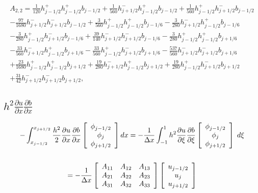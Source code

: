 \documentclass[12pt]{article}
\begin{document}
\begin{multline*} A_{2,2} = \frac{1}{120} h_{j-1/2}^+ h_{j-1/2}^+ b_{j-1/2}+\frac{1}{560} h_{j+1/2}^- h_{j-1/2}^+ b_{j-1/2}+\frac{1}{560} h_{j-1/2}^+ h_{j+1/2}^- b_{j-1/2}\\-\frac{97}{1680} h_{j+1/2}^- h_{j+1/2}^- b_{j-1/2}+\frac{3}{560} h_{j-1/2}^+ h_{j-1/2}^+ b_{j-1/6}-\frac{3}{280} h_{j+1/2}^- h_{j-1/2}^+ b_{j-1/6}\\-\frac{3}{280} h_{j-1/2}^+ h_{j+1/2}^- b_{j-1/6}+\frac{39}{140} h_{j+1/2}^- h_{j+1/2}^- b_{j-1/6}-\frac{3}{280} h_{j-1/2}^+ h_{j-1/2}^+ b_{j+1/6}\\-\frac{33}{560} h_{j+1/2}^- h_{j-1/2}^+ b_{j+1/6}-\frac{33}{560} h_{j-1/2}^+ h_{j+1/2}^- b_{j+1/6}-\frac{537}{560} h_{j+1/2}^- h_{j+1/2}^- b_{j+1/6}\\+\frac{23}{1680} h_{j-1/2}^+ h_{j-1/2}^+ b_{j+1/2}+\frac{19}{280} h_{j+1/2}^- h_{j-1/2}^+ b_{j+1/2}+\frac{19}{280} h_{j-1/2}^+ h_{j+1/2}^- b_{j+1/2}\\+\frac{31}{42} h_{j+1/2}^- h_{j+1/2}^- b_{j+1/2}, \end{multline*}
 
 
\subsection{$h^2 \frac{\partial u}{\partial x} \frac{\partial b}{\partial x}$}

\begin{multline*}
-\int_{x_{j-1/2}}^{x_{j+1/2}}\frac{h^2}{2}  \frac{\partial u}{\partial x} \frac{\partial b}{\partial x} \left[\begin{array}{c}\phi_{j-1/2} \\\phi_{j}\\\phi_{j+1/2} \end{array}\right]  dx = -\frac{1}{\Delta x} \int_{-1}^{1}h^2 \frac{\partial u}{\partial \xi}  \frac{\partial b}{\partial \xi}  \left[\begin{array}{c}\phi_{j-1/2} \\\phi_{j}\\\phi_{j+1/2} \end{array}\right] \; d\xi \\ \\ =
-\frac{1}{\Delta x} \left[\begin{array}{c c c } 
A_{11} & A_{12}  & A_{13}\\
A_{21} & A_{22}  & A_{23}\\
A_{31} & A_{32}  & A_{33}\\
\end{array}\right] \left[\begin{array}{c}u_{j-1/2} \\u_{j}\\u_{j+1/2} \end{array}\right]
\end{multline*}
\end{document}
